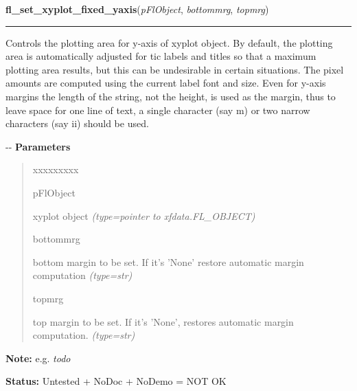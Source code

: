     \label{xformslib:flxyplot:fl_set_xyplot_fixed_yaxis}

    \vspace{0.5ex}

\hspace{.8\funcindent}\begin{boxedminipage}{\funcwidth}

    \raggedright \textbf{fl\_set\_xyplot\_fixed\_yaxis}(\textit{pFlObject}, \textit{bottommrg}, \textit{topmrg})

    \vspace{-1.5ex}

    \rule{\textwidth}{0.5\fboxrule}
\setlength{\parskip}{2ex}

Controls the plotting area for y-axis of xyplot object. By default,
the plotting area is automatically adjusted for tic labels and titles so
that a maximum plotting area results, but this can be undesirable in
certain situations. The pixel amounts are computed using the current
label font and size. Even for y-axis margins the length of the string,
not the height, is used as the margin, thus to leave space for one line
of text, a single character (say m) or two narrow characters (say ii)
should be used.

-{}-
\setlength{\parskip}{1ex}
      \textbf{Parameters}
      \vspace{-1ex}

      \begin{quote}
        \begin{Ventry}{xxxxxxxxx}

          \item[pFlObject]


xyplot object
            {\it (type=pointer to xfdata.FL\_OBJECT)}

          \item[bottommrg]


bottom margin to be set. If it's 'None' restore automatic margin
computation
            {\it (type=str)}

          \item[topmrg]


top margin to be set. If it's 'None', restores automatic margin
computation.
            {\it (type=str)}

        \end{Ventry}

      \end{quote}

\textbf{Note:} 
e.g. \emph{todo}


\textbf{Status:} 
Untested + NoDoc + NoDemo = NOT OK


    \end{boxedminipage}

